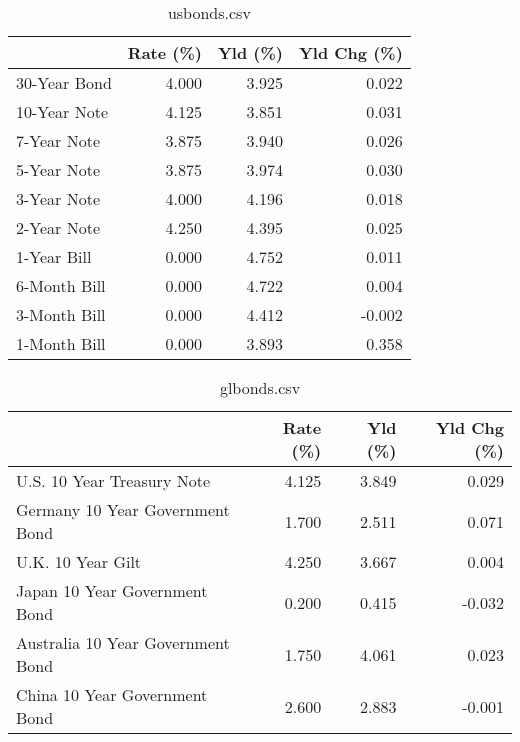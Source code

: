 \documentclass{article}%
\begin{document}
%


\begin{table}[htbp]%
\caption{usbonds.csv}%
\centering%
\begin{adjustbox}{width=1\textwidth}%
\begin{tabular}{lrrr}
\toprule
             &  Rate (\%) &  Yld (\%) &  Yld Chg (\%) \\
\midrule
30-Year Bond &     4.000 &    3.925 &        0.022 \\
10-Year Note &     4.125 &    3.851 &        0.031 \\
 7-Year Note &     3.875 &    3.940 &        0.026 \\
 5-Year Note &     3.875 &    3.974 &        0.030 \\
 3-Year Note &     4.000 &    4.196 &        0.018 \\
 2-Year Note &     4.250 &    4.395 &        0.025 \\
 1-Year Bill &     0.000 &    4.752 &        0.011 \\
6-Month Bill &     0.000 &    4.722 &        0.004 \\
3-Month Bill &     0.000 &    4.412 &       -0.002 \\
1-Month Bill &     0.000 &    3.893 &        0.358 \\
\bottomrule
\end{tabular}
%
\end{adjustbox}%
\end{table}

%


\begin{table}[htbp]%
\caption{glbonds.csv}%
\centering%
\begin{adjustbox}{width=1\textwidth}%
\begin{tabular}{lrrr}
\toprule
                                  &  Rate (\%) &  Yld (\%) &  Yld Chg (\%) \\
\midrule
       U.S. 10 Year Treasury Note &     4.125 &    3.849 &        0.029 \\
  Germany 10 Year Government Bond &     1.700 &    2.511 &        0.071 \\
                U.K. 10 Year Gilt &     4.250 &    3.667 &        0.004 \\
    Japan 10 Year Government Bond &     0.200 &    0.415 &       -0.032 \\
Australia 10 Year Government Bond &     1.750 &    4.061 &        0.023 \\
    China 10 Year Government Bond &     2.600 &    2.883 &       -0.001 \\
\bottomrule
\end{tabular}
%
\end{adjustbox}%
\end{table}
\end{document}

